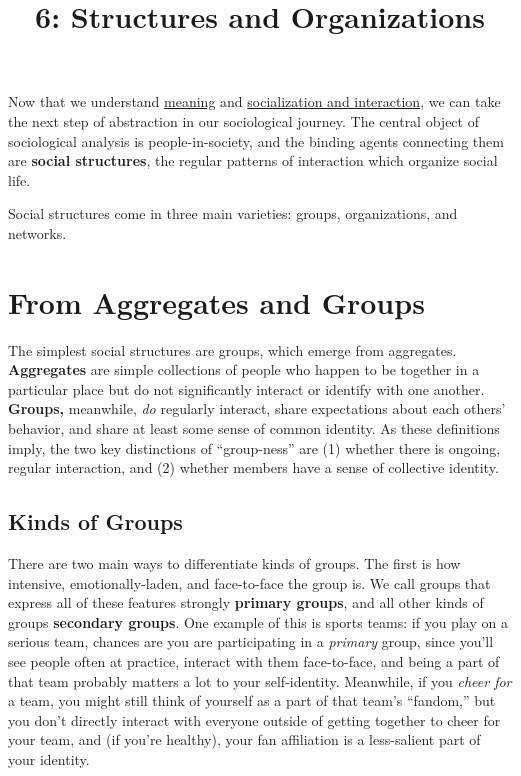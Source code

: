 \documentclass[
  letterpaper,
  DIV=11,
  numbers=noendperiod,
  oneside]{scrartcl}
\title{6: Structures and Organizations}
\author{}
\date{}
\begin{document}
\maketitle


Now that we understand \href{./Ch_4_Meaning.qmd}{meaning} and
\href{./Ch_5_Interaction.qmd}{socialization and interaction}, we can
take the next step of abstraction in our sociological journey. The
central object of sociological analysis is people-in-society, and the
binding agents connecting them are \textbf{social structures}, the
regular patterns of interaction which organize social life.

Social structures come in three main varieties: groups, organizations,
and networks.

\section{From Aggregates and Groups}\label{from-aggregates-and-groups}

The simplest social structures are groups, which emerge from aggregates.
\textbf{Aggregates} are simple collections of people who happen to be
together in a particular place but do not significantly interact or
identify with one another. \textbf{Groups,} meanwhile, \emph{do}
regularly interact, share expectations about each others' behavior, and
share at least some sense of common identity. As these definitions
imply, the two key distinctions of ``group-ness'' are (1) whether there
is ongoing, regular interaction, and (2) whether members have a sense of
collective identity.

\subsection{Kinds of Groups}\label{kinds-of-groups}

There are two main ways to differentiate kinds of groups. The first is
how intensive, emotionally-laden, and face-to-face the group is. We call
groups that express all of these features strongly \textbf{primary
groups}, and all other kinds of groups \textbf{secondary
groups}. One example of this is
sports teams: if you play on a serious team, chances are you are
participating in a \emph{primary} group, since you'll see people often
at practice, interact with them face-to-face, and being a part of that
team probably matters a lot to your self-identity. Meanwhile, if you
\emph{cheer for} a team, you might still think of yourself as a part of
that team's ``fandom,'' but you don't directly interact with everyone
outside of getting together to cheer for your team, and (if you're
healthy), your fan affiliation is a less-salient part of your identity.
\end{document}
